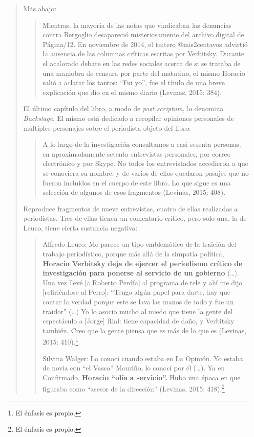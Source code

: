 \begin{quote}
Más abajo:

\begin{quote}
	Mientras, la mayoría de las notas que vindicaban las denuncias contra Bergoglio desapareció misteriosamente del archivo digital de Página/12. En noviembre de 2014, el tuitero @mis2centavos advirtió la ausencia de las columnas críticas escritas por Verbitsky. Durante el acalorado debate en las redes sociales acerca de si se trataba de una maniobra de censura por parte del matutino, el mismo Horacio salió a aclarar los tantos: \enquote{Fui yo}, fue el título de una breve explicación que dio en el mismo diario (Levinas, 2015: 384).
\end{quote}


El último capítulo del libro, a modo de \emph{post scriptum}, lo denomina \emph{Backstage}. El mismo está dedicado a recopilar opiniones personales de múltiples personajes sobre el periodista objeto del libro:

\begin{quote}
	A lo largo de la investigación consultamos a casi sesenta personas, en aproximadamente setenta entrevistas personales, por correo electrónico y por Skype. No todos los entrevistados accedieron a que se conociera su nombre, y de varios de ellos quedaron pasajes que no fueron incluidos en el cuerpo de este libro. Lo que sigue es una selección de algunos de esos fragmentos (Levinas, 2015: 408).
\end{quote}


Reproduce fragmentos de nueve entrevistas, cuatro de ellas realizadas a periodistas. Tres de ellas tienen un comentario crítico, pero solo una, la de Leuco, tiene cierta sustancia negativa:

\begin{quote}
	Alfredo Leuco: Me parece un tipo emblemático de la traición del trabajo periodístico, porque más allá de la simpatía política, \textbf{Horacio Verbitsky deja de ejercer el periodismo crítico de investigación para ponerse al servicio de un gobierno} (\dots). Una vez llevé {[}a Roberto Perdía{]} al programa de tele y ahí me dijo {[}refiriéndose al Perro{]}: \enquote{Tengo algún papel para darte, hay que contar la verdad porque este se lava las manos de todo y fue un traidor} (\dots) Yo lo asocio mucho al miedo que tiene la gente del espectáculo a {[}Jorge{]} Rial: tiene capacidad de daño, y Verbitsky también. Creo que la gente piensa que es más de lo que es (Levinas, 2015: 410).\footnote{El énfasis es propio.}

	Silvina Walger: Lo conocí cuando estaba en La Opinión. Yo estaba de novia con \enquote{el Vasco} Mouriño, lo conocí por él (\dots). Ya en Confirmado, \textbf{Horacio \enquote{olía a servicio}.} Hubo una época en que figuraba como \enquote{asesor de la dirección} (Levinas, 2015: 418).\footnote{El énfasis es propio.}


\end{quote}
\end{quote}
